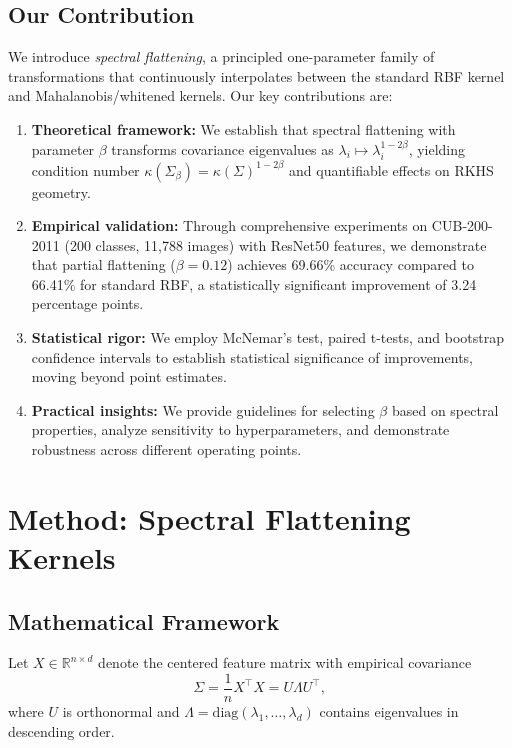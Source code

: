 \documentclass[11pt]{article}
\begin{document}
\subsection{Our Contribution}

We introduce \emph{spectral flattening}, a principled one-parameter family of transformations that continuously interpolates between the standard RBF kernel and Mahalanobis/whitened kernels. Our key contributions are:

\begin{enumerate}
    \item \textbf{Theoretical framework:} We establish that spectral flattening with parameter $\beta$ transforms covariance eigenvalues as $\lambda_i \mapsto \lambda_i^{1-2\beta}$, yielding condition number $\kappa(\Sigma_\beta) = \kappa(\Sigma)^{1-2\beta}$ and quantifiable effects on RKHS geometry.
    
    \item \textbf{Empirical validation:} Through comprehensive experiments on CUB-200-2011 (200 classes, 11,788 images) with ResNet50 features, we demonstrate that partial flattening ($\beta = 0.12$) achieves 69.66\% accuracy compared to 66.41\% for standard RBF, a statistically significant improvement of 3.24 percentage points.
    
    \item \textbf{Statistical rigor:} We employ McNemar's test, paired t-tests, and bootstrap confidence intervals to establish statistical significance of improvements, moving beyond point estimates.
    
    \item \textbf{Practical insights:} We provide guidelines for selecting $\beta$ based on spectral properties, analyze sensitivity to hyperparameters, and demonstrate robustness across different operating points.
\end{enumerate}

\section{Method: Spectral Flattening Kernels}

\subsection{Mathematical Framework}

Let $X \in \mathbb{R}^{n \times d}$ denote the centered feature matrix with empirical covariance
\begin{equation}
    \Sigma = \frac{1}{n} X^\top X = U \Lambda U^\top,
\end{equation}
where $U$ is orthonormal and $\Lambda = \text{diag}(\lambda_1, \ldots, \lambda_d)$ contains eigenvalues in descending order.
\end{document}
